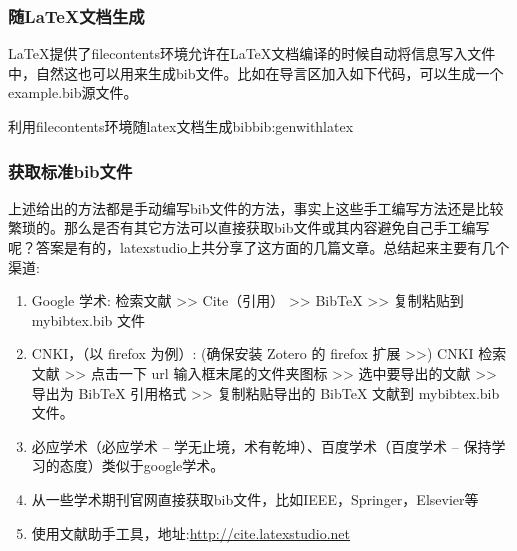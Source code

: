 \documentclass[twoside]{article} %
\begin{document}
\subsubsection{随\LaTeX 文档生成}
\LaTeX 提供了filecontents环境允许在\LaTeX 文档编译的时候自动将信息写入文件中，自然这也可以用来生成bib文件。比如在导言区加入如下代码，可以生成一个example.bib源文件。
\begin{codetex}{利用filecontents环境随latex文档生成bib}{bib:genwithlatex}
\usepackage{filecontents}
\end{codetex}

\subsubsection{获取标准bib文件}
上述给出的方法都是手动编写bib文件的方法，事实上这些手工编写方法还是比较繁琐的。那么是否有其它方法可以直接获取bib文件或其内容避免自己手工编写呢？答案是有的，latexstudio上共分享了这方面的几篇文章\cite{北京交通大学研究生公众号2016--}\cite{olref2016--}\cite{文献助手2016--}。总结起来主要有几个渠道:
\begin{enumerate}
  \item Google 学术: 检索文献 >> Cite（引用） >> BibTeX >> 复制粘贴到 mybibtex.bib 文件
  \item CNKI，（以 firefox 为例）: (确保安装 Zotero 的 firefox 扩展 >>) CNKI 检索文献 >> 点击一下 url 输入框末尾的文件夹图标 >> 选中要导出的文献 >> 导出为 BibTeX 引用格式 >> 复制粘贴导出的 BibTeX 文献到 mybibtex.bib 文件。
  \item 必应学术（必应学术 – 学无止境，术有乾坤）、百度学术（百度学术 – 保持学习的态度）类似于google学术。
  \item 从一些学术期刊官网直接获取bib文件，比如IEEE，Springer，Elsevier等
  \item 使用文献助手工具，地址:\url{http://cite.latexstudio.net}
\end{enumerate}
\end{document}

